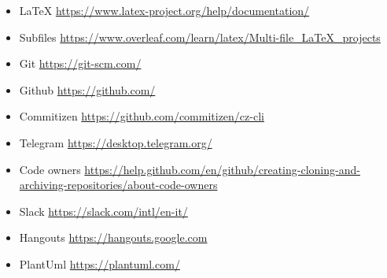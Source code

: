 \documentclass[../norme-di-progetto.tex]{subfiles}
\begin{document}
\begin{itemize}
  \item LaTeX
        \newline \url{https://www.latex-project.org/help/documentation/}
  \item Subfiles
        \newline \url{https://www.overleaf.com/learn/latex/Multi-file_LaTeX_projects}
  \item Git
        \newline \url{https://git-scm.com/}
  \item Github
        \newline \url{https://github.com/}
  \item Commitizen
        \newline \url{https://github.com/commitizen/cz-cli}
  \item Telegram
        \newline \url{https://desktop.telegram.org/}
  \item Code owners
        \newline \url{https://help.github.com/en/github/creating-cloning-and-archiving-repositories/about-code-owners}
  \item Slack
        \newline \url{https://slack.com/intl/en-it/}
  \item Hangouts
        \newline \url{https://hangouts.google.com}
  \item PlantUml
        \newline \url{https://plantuml.com/}
\end{itemize}
\end{document}
